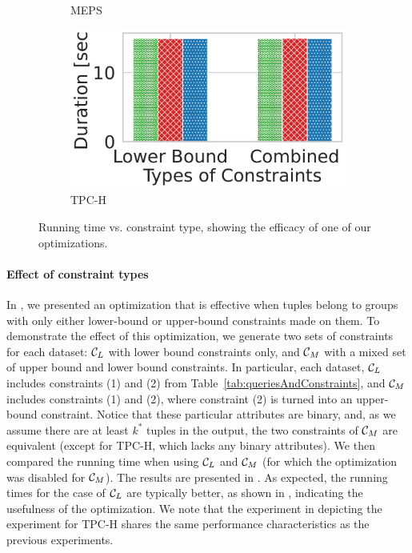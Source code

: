 \begin{figure}[t]
\begin{subfigure}{.35\textwidth}
      \caption{MEPS}
      \label{fig:r19}
    \end{subfigure}
    \begin{subfigure}{.35\textwidth}
      \centering
      \includegraphics[width=.75\linewidth]{figures/tpch_const_type.pdf}
      \caption{TPC-H}
      \label{fig:r20}
    \end{subfigure}
    
    \caption{Running time vs. constraint type, showing the efficacy of one of our optimizations.}
    \label{fig:time_vs_constraint_type}
\end{figure}
\paragraph*{\textbf{Effect of constraint types}}
In , we presented an optimization that is effective when tuples belong to groups with only either lower-bound or upper-bound constraints made on them. To demonstrate the effect of this optimization, we generate two sets of constraints for each dataset: $\mathcal{C}_{L}$ with lower bound constraints only, and $\mathcal{C}_{M}$ with a mixed set of upper bound and lower bound constraints. In particular, each dataset, $\mathcal{C}_{L}$ includes constraints (1) and (2) from Table~\ref{tab:queriesAndConstraints}, and $\mathcal{C}_{M}$ includes constraints (1) and (2), where constraint (2) is turned into an upper-bound constraint. 
Notice that these particular attributes are binary, and, as we assume there are at least $k^*$ tuples in the output, the two constraints of $\mathcal{C}_{M}$ are equivalent (except for TPC-H, which lacks any binary attributes). We then compared the running time when using $\mathcal{C}_{L}$ and $\mathcal{C}_{M}$ (for which the optimization was disabled for $\mathcal{C}_{M}$). The results are presented in . As expected, the running times for the case of $\mathcal{C}_{L}$ are typically better, as shown in , indicating the usefulness of the optimization. We note that the experiment in  depicting the experiment for TPC-H shares the same performance characteristics as the previous experiments.




